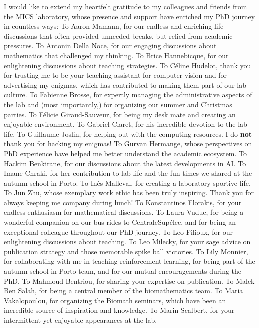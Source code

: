 I would like to extend my heartfelt gratitude to my colleagues and friends from the MICS laboratory, whose presence and support have enriched my PhD journey in countless ways:\n
To Aaron Mamann, for our endless and enriching life discussions that often provided unneeded breaks, but relied from academic pressures.\n
To Antonin Della Noce, for our engaging discussions about mathematics that challenged my thinking.\n
To Brice Hannebicque, for our enlightening discussions about teaching strategies.\n
To Céline Hudelot, thank you for trusting me to be your teaching assistant for computer vision and for advertising my enigmas, which has contributed to making them part of our lab culture.\n
To Fabienne Brosse, for expertly managing the administrative aspects of the lab and (most importantly,) for organizing our summer and Christmas parties.\n
To Félicie Giraud-Sauveur, for being my desk mate and creating an enjoyable environment.\n
To Gabriel Claret, for his incredible devotion to the lab life.\n
To Guillaume Joslin, for helping out with the computing resources.
I do \textbf{not} thank you for hacking my enigmas!\n
To Gurvan Hermange, whose perspectives on PhD experience have helped me better understand the academic ecosystem.\n
To Hackim Benkirane, for our discussions about the latest developments in AI.\n
To Imane Chraki, for her contribution to lab life and the fun times we shared at the autumn school in Porto.\n
To Inès Malleval, for creating a laboratory sportive life.\n
To Jun Zhu, whose exemplary work ethic has been truly inspiring.
Thank you for always keeping me company during lunch!\n
To Konstantinos Florakis, for your endless enthusiasm for mathematical discussions.\n
To Laura Vuduc, for being a wonderful companion on our bus rides to CentraleSupélec, and for being an exceptional colleague throughout our PhD journey.\n
To Leo Filioux, for our enlightening discussions about teaching.\n
To Leo Milecky, for your sage advice on publication strategy and those memorable spike ball victories.\n
To Lily Monnier, for collaborating with me in teaching reinforcement learning, for being part of the autumn school in Porto team, and for our mutual encouragements during the PhD.\n
To Mahmoud Bentriou, for sharing your expertise on publication.\n
To Malek Ben Salah, for being a central member of the biomathematics team.\n
To Maria Vakalopoulou, for organizing the Biomath seminars, which have been an incredible source of inspiration and knowledge.\n
To Marin Scalbert, for your intermittent yet enjoyable appearances at the lab.\n
